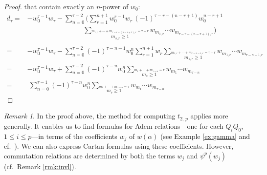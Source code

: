 \documentclass{gtpart}
\theoremstyle{definition}
\theoremstyle{remark}
\newtheorem{rmk}[equation]{Remark}
\newcommand{\A}{\alpha}
\newcommand{\T}{\tau}
\renewcommand{\=}{\approx}
\renewcommand{\-}{\sim}
\numberwithin{equation}{section}
\begin{document}
\begin{proof}
 that contain exactly an $n$-power of $w_0$: 
 \begin{equation*}
  \begin{split}
   d_\T = & -w_0^{\T - 1} w_\T - \sum_{n = 0}^{\T - 2} 
            \Bigg( \sum_{r = 1}^{n + 1} w_0^{r - 1} w_r \, 
            (-1)^{\T - r - (n - r + 1)} w_0^{n - r + 1} \\
          & \qquad\qquad\qquad\qquad\, \sum_{\stackrel{\scriptstyle m_{1,r} 
            + \cdots + m_{\T - r - (n - r + 1),r} = \T - r}{m_{s,r} \geq 1}} 
            w_{m_{1,r}} \cdots w_{m_{\T - r - (n - r + 1),r}} \Bigg) \\\\
        = & -w_0^{\T - 1} w_\T - \sum_{n = 0}^{\T - 2} (-1)^{\T - n - 1} w_0^n 
            \sum_{r = 1}^{n + 1} w_r \sum_{\stackrel{\scriptstyle m_{1,r} 
            + \cdots + m_{\T - n - 1,r} = \T - r}{m_{s,r} \geq 1}} w_{m_{1,r}} 
            \cdots w_{m_{\T - n - 1,r}} \\
        = & -w_0^{\T - 1} w_\T + \sum_{n = 0}^{\T - 2} (-1)^{\T - n} w_0^n 
            \sum_{\stackrel{\scriptstyle m_1 + \cdots + m_{\T - n} = \T}{m_s 
            \geq 1}} w_{m_1} \cdots w_{m_{\T - n}} \\
        = & ~ \sum_{n = 0}^{\T - 1} (-1)^{\T - n} w_0^n 
            \sum_{\stackrel{\scriptstyle m_1 + \cdots + m_{\T - n} = \T}{m_s 
            \geq 1}} w_{m_1} \cdots w_{m_{\T - n}} 
  \end{split}
 \end{equation*}
\end{proof}

\begin{rmk}
 \label{rmk:Adem}
 In the proof above, the method for computing $t_{2,\,p}$ applies more 
 generally.  It enables us to find formulas for Adem relations---one for each 
 $Q_i Q_0$, $1 \leq i \leq p$---in terms of the coefficients $w_j$ of $w(\A)$ 
 (see Example \ref{ex:gamma} and cf.~\cite[proof of Proposition 3.6\,(iv)]{p3}).  
 We can also express Cartan formulas using these coefficients.  However, 
 commutation relations are determined by both the terms $w_j$ and $\psi^p(w_j)$ 
 (cf.~Remark \ref{rmk:invl}).  
\end{rmk}
\end{document}
